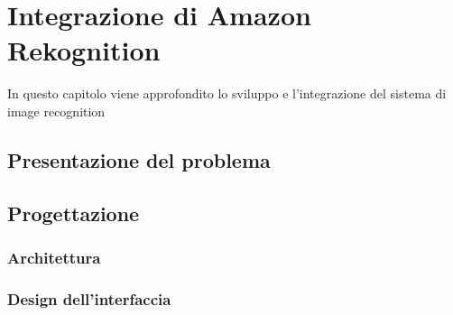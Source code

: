 
\chapter{Integrazione di Amazon Rekognition}
\label{cap:rekognition}

In questo capitolo viene approfondito lo sviluppo e l'integrazione del sistema di image recognition\\


\section{Presentazione del problema}
\section{Progettazione}
	\subsection{Architettura}
	\subsection{Design dell'interfaccia}

